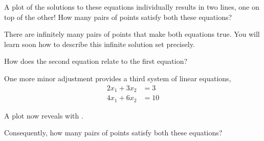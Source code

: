 \documentclass{ximera}
\begin{document}
\begin{problem}
\begin{example}
    \begin{question}
      A plot of the solutions to these equations individually results in two lines, one on top of the other!  How many pairs of points satisfy both these equations?
      \begin{multipleChoice}
      \end{multipleChoice}    
    
      \begin{feedback}
        There are infinitely many pairs of points that make both equations true.  You will learn soon how to describe this infinite solution set precisely.
      \end{feedback}

      \begin{question}
        How does the second equation relate to the first equation?
        \begin{multipleChoice}
        \end{multipleChoice}
      \end{question}
    \end{question}
  \end{example}

  \begin{example}
    One more minor adjustment provides a third system of linear equations,
    \begin{align*}
      2x_1+3x_2&=3\\
      4x_1+6x_2&=10
    \end{align*}

    \begin{question}
      A plot now reveals  with .

      \begin{question}
        Consequently, how many pairs of points satisfy both these equations?
        \begin{multipleChoice}
        \end{multipleChoice}    
        

\end{question}
\end{question}
\end{example}
\end{problem}
\end{document}
